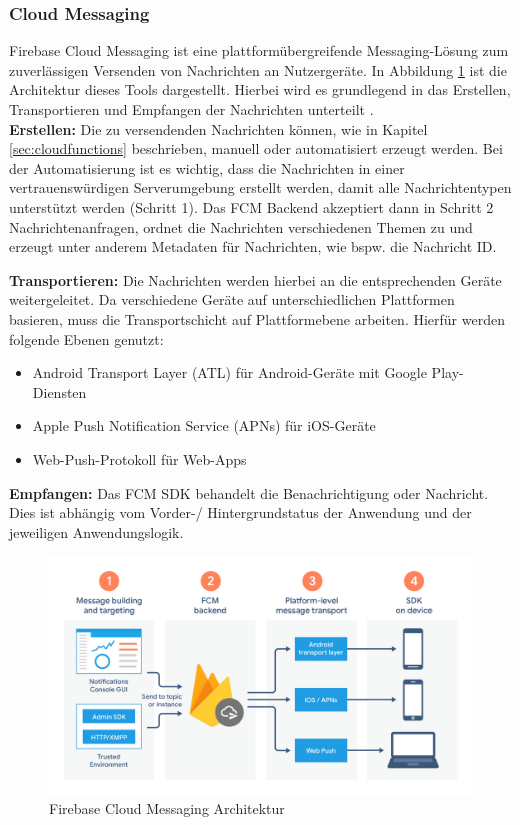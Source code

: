 \subsubsection{Cloud Messaging}
Firebase Cloud Messaging ist eine plattformübergreifende Messaging-Lösung zum zuverlässigen Versenden von Nachrichten an Nutzergeräte.
In Abbildung \ref{fig:cloudmessaging_architecture} ist die Architektur dieses Tools dargestellt.
Hierbei wird es grundlegend in das Erstellen, Transportieren und Empfangen der Nachrichten unterteilt \cite{firebase2021}.\\

\noindent
{}
\textbf{Erstellen:} Die zu versendenden Nachrichten können, wie in Kapitel \ref{sec:cloudfunctions} beschrieben, manuell oder automatisiert erzeugt werden. 
Bei der Automatisierung ist es wichtig, dass die Nachrichten in einer vertrauenswürdigen Serverumgebung erstellt werden, damit alle Nachrichtentypen unterstützt werden (Schritt 1). 
Das FCM Backend akzeptiert dann in Schritt 2 Nachrichtenanfragen, ordnet die Nachrichten verschiedenen Themen zu und erzeugt unter anderem Metadaten für Nachrichten, wie bspw. die Nachricht ID.

\noindent
{}
\textbf{Transportieren:} Die Nachrichten werden hierbei an die entsprechenden Geräte weitergeleitet.
Da verschiedene Geräte auf unterschiedlichen Plattformen basieren, muss die Transportschicht auf Plattformebene arbeiten.
Hierfür werden folgende Ebenen genutzt:
	\begin{itemize}
		\item Android Transport Layer (ATL) für Android-Geräte mit Google Play-Diensten
		\item Apple Push Notification Service (APNs) für iOS-Geräte
		\item Web-Push-Protokoll für Web-Apps
	\end{itemize}

\noindent
{}
\textbf{Empfangen:} Das FCM SDK behandelt die Benachrichtigung oder Nachricht. Dies ist abhängig vom Vorder-/ Hintergrundstatus der Anwendung und der jeweiligen Anwendungslogik.


\begin{figure}[tbt]
	\begin{center}
		\includegraphics[scale=0.23]{Theoretische_Grundlagen/images/firebase_cloudmessaging_architecture.png}
	\end{center}
	\caption{Firebase Cloud Messaging Architektur}
	\label{fig:cloudmessaging_architecture}
\end{figure}

